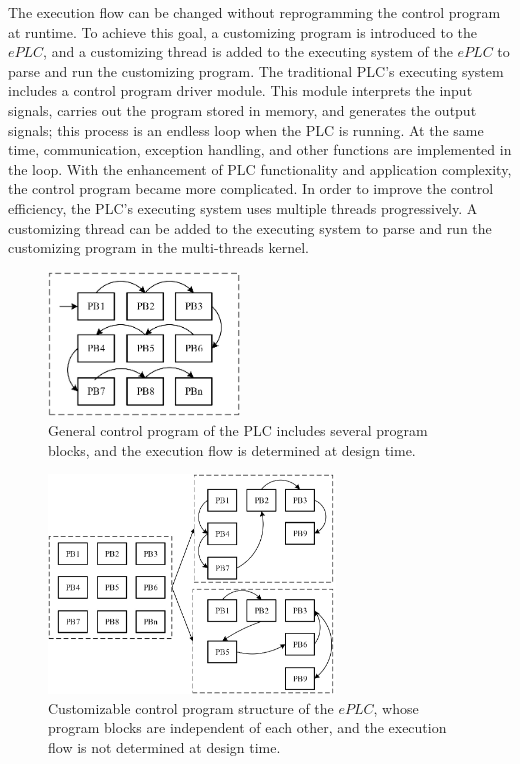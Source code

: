 \documentclass[journal]{IEEEtran}
\begin{document}
The execution flow can be changed without reprogramming the control program at runtime. To achieve this goal, a customizing program is introduced to the $ePLC$, and a customizing thread is added to the executing system of the $ePLC$ to parse and run the customizing program. The traditional PLC's executing system includes a control program driver module. This module interprets the input signals, carries out the program stored in memory, and generates the output signals; this process is an endless loop when the PLC is running. At the same time, communication, exception handling, and other functions are implemented in the loop. With the enhancement of PLC functionality and application complexity, the control program became more complicated. In order to improve the control efficiency, the PLC's executing system uses multiple threads progressively. A customizing thread can be added to the executing system to parse and run the customizing program in the multi-threads kernel.

\begin{figure}
\centering
\includegraphics[width=2in]{fig/FIG2_TII-18-0024.eps}
\caption{ General control program of the PLC includes several program blocks, and the execution flow is determined at design time.}
\label{fig:controlblocks}
\end{figure}

\begin{figure}
\centering
\includegraphics[width=3in]{fig/FIG3_TII-18-0024.eps}
\caption{ Customizable control program structure of the $ePLC$,  whose program blocks are independent of each other, and the execution flow is not determined at design time.}
\label{fig:customeprogram}
\end{figure}
\end{document}
